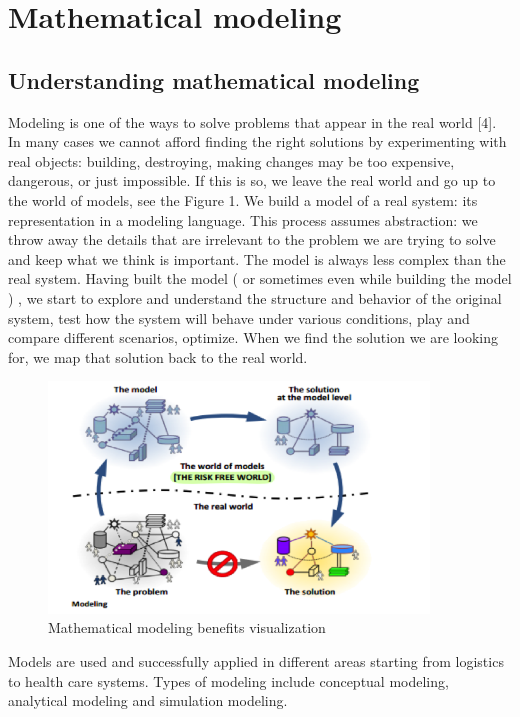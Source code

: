 \chapter{Mathematical modeling}

\section{Understanding mathematical modeling}

Modeling is one of the ways to solve problems that appear in the real world [4]. In many cases we cannot afford finding the right solutions by experimenting   with real objects:  building, destroying, making changes may be too expensive, dangerous, or just impossible. If this is so, we leave the real world and go up to the world of models, see the Figure 1. We build a model of a real system: its representation in a modeling language. This process assumes abstraction: we throw away the details that are irrelevant to the problem we are trying to solve and keep what we think is important. The model is always less complex than the real system. Having built the model ( or sometimes  even while building the model ) , we  start to explore and understand the structure and behavior of the original system, test how the system will behave under various conditions, play  and compare different scenarios, optimize.  When we find the solution we are looking for, we map that solution back to the real world.

\begin{figure}
   \centering
	\includegraphics[width=0.9\textwidth]{img/modeling}
	\caption{Mathematical modeling benefits visualization}
\end{figure}

Models are used and successfully applied in different areas starting from logistics to health care systems. Types of modeling include conceptual modeling, analytical modeling and simulation modeling.

